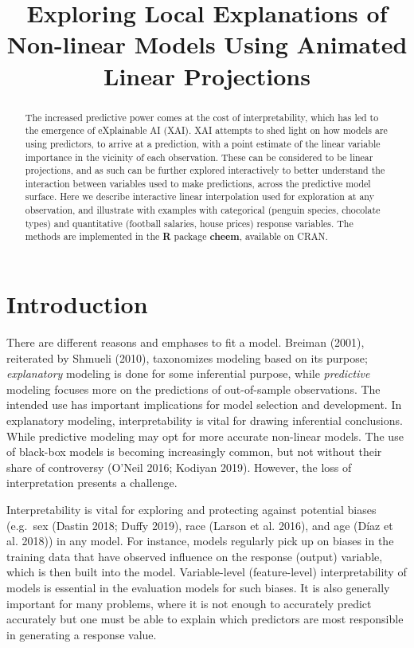 \documentclass[
]{article}
\title{Exploring Local Explanations of Non-linear Models Using Animated Linear Projections}
\author{}
\date{\vspace{-2.5em}}
\begin{document}
\maketitle
\begin{abstract}
The increased predictive power comes at the cost of interpretability, which has led to the emergence of eXplainable AI (XAI). XAI attempts to shed light on how models are using predictors, to arrive at a prediction, with a point estimate of the linear variable importance in the vicinity of each observation. These can be considered to be linear projections, and as such can be further explored interactively to better understand the interaction between variables used to make predictions, across the predictive model surface. Here we describe interactive linear interpolation used for exploration at any observation, and illustrate with examples with categorical (penguin species, chocolate types) and quantitative (football salaries, house prices) response variables. The methods are implemented in the \textbf{R} package \textbf{cheem}, available on CRAN.
\end{abstract}

\hypertarget{sec:intro}{%
\section{Introduction}\label{sec:intro}}

There are different reasons and emphases to fit a model. Breiman (2001), reiterated by Shmueli (2010), taxonomizes modeling based on its purpose; \emph{explanatory} modeling is done for some inferential purpose, while \emph{predictive} modeling focuses more on the predictions of out-of-sample observations. The intended use has important implications for model selection and development. In explanatory modeling, interpretability is vital for drawing inferential conclusions. While predictive modeling may opt for more accurate non-linear models. The use of black-box models is becoming increasingly common, but not without their share of controversy (O'Neil 2016; Kodiyan 2019). However, the loss of interpretation presents a challenge.

Interpretability is vital for exploring and protecting against potential biases (e.g.~sex (Dastin 2018; Duffy 2019), race (Larson et al. 2016), and age (Díaz et al. 2018)) in any model. For instance, models regularly pick up on biases in the training data that have observed influence on the response (output) variable, which is then built into the model. Variable-level (feature-level) interpretability of models is essential in the evaluation models for such biases. It is also generally important for many problems, where it is not enough to accurately predict accurately but one must be able to explain which predictors are most responsible in generating a response value.
\end{document}
